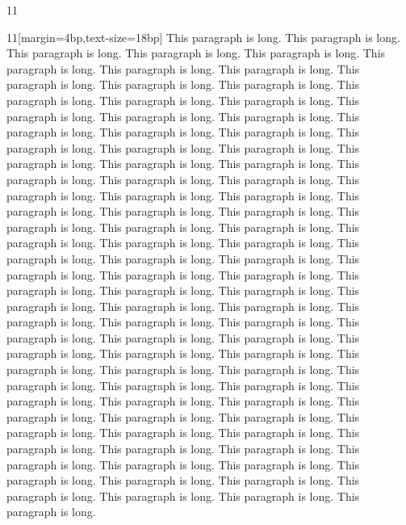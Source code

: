 \documentclass[paper={80mm,80mm}]{ropas-poster}
\begin{document}
\begin{postergrid}{1}{1}
\begin{posterblock}{1}{1}[margin=4bp,text-size=18bp]
This paragraph is long. This paragraph is long. This paragraph is long. This paragraph is long. This paragraph is long. This paragraph is long. This paragraph is long. This paragraph is long. This paragraph is long. This paragraph is long. This paragraph is long. This paragraph is long. This paragraph is long. This paragraph is long. This paragraph is long. This paragraph is long. This paragraph is long. This paragraph is long. This paragraph is long. This paragraph is long. This paragraph is long. This paragraph is long. This paragraph is long. This paragraph is long. This paragraph is long. This paragraph is long. This paragraph is long. This paragraph is long. This paragraph is long. This paragraph is long. This paragraph is long. This paragraph is long. This paragraph is long. This paragraph is long. This paragraph is long. This paragraph is long. This paragraph is long. This paragraph is long. This paragraph is long. This paragraph is long. This paragraph is long. This paragraph is long. This paragraph is long. This paragraph is long. This paragraph is long. This paragraph is long. This paragraph is long. This paragraph is long. This paragraph is long. This paragraph is long. This paragraph is long. This paragraph is long. This paragraph is long. This paragraph is long. This paragraph is long. This paragraph is long. This paragraph is long. This paragraph is long. This paragraph is long. This paragraph is long. This paragraph is long. This paragraph is long. This paragraph is long. This paragraph is long. This paragraph is long. This paragraph is long. This paragraph is long. This paragraph is long. This paragraph is long. This paragraph is long. This paragraph is long. This paragraph is long. This paragraph is long. This paragraph is long. This paragraph is long. This paragraph is long. This paragraph is long. This paragraph is long. This paragraph is long. This paragraph is long. This paragraph is long. This paragraph is long. This paragraph is long. This paragraph is long. This paragraph is long. This paragraph is long. This paragraph is long. This paragraph is long. This paragraph is long. This paragraph is long. 
\end{posterblock}
\end{postergrid}
\end{document}
